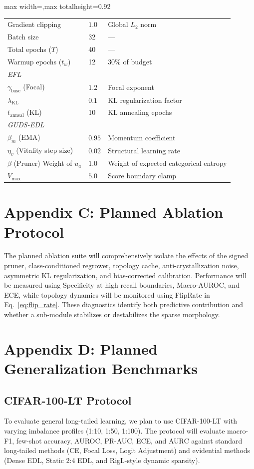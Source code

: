 \documentclass[letterpaper]{article} %
\begin{document}
\begin{table}[H]
\begin{adjustbox}{max width=\columnwidth,max totalheight=0.92\textheight}
\begin{tabular}{@{}p{}p{}p{}@{}}
Gradient clipping & $1.0$ & Global $L_2$ norm \\
Batch size & 32 & --- \\
Total epochs ($T$) & 40 & --- \\
Warmup epochs ($t_w$) & 12 & 30\% of budget \\
\midrule
\multicolumn{3}{l}{\emph{EFL}} \\
$\gamma_{\text{base}}$ (Focal) & $1.2$ & Focal exponent \\
$\lambda_{\text{KL}}$ & $0.1$ & KL regularization factor \\
$t_{\text{anneal}}$ (KL) & 10 & KL annealing epochs \\
\midrule
\multicolumn{3}{l}{\emph{GUDS-EDL}} \\
$\beta_m$ (EMA) & $0.95$ & Momentum coefficient \\
$\eta_v$ (Vitality step size) & $0.02$ & Structural learning rate \\
$\beta$ (Pruner) Weight of $u_a$ & $1.0$ & Weight of expected categorical entropy \\
$V_{\max}$ & $5.0$ & Score boundary clamp \\
\bottomrule
\end{tabular}
\end{adjustbox}
\end{table}

\FloatBarrier

\section{Appendix C: Planned Ablation Protocol}
The planned ablation suite will comprehensively isolate the effects of the signed pruner, class-conditioned regrower, topology cache, anti-crystallization noise, asymmetric KL regularization, and bias-corrected calibration. Performance will be measured using Specificity at high recall boundaries, Macro-AUROC, and ECE, while topology dynamics will be monitored using FlipRate in Eq.~\ref{eq:flip_rate}. These diagnostics identify both predictive contribution and whether a sub-module stabilizes or destabilizes the sparse morphology.

\section{Appendix D: Planned Generalization Benchmarks}

\subsection{CIFAR-100-LT Protocol}
To evaluate general long-tailed learning, we plan to use CIFAR-100-LT with varying imbalance profiles (1:10, 1:50, 1:100). The protocol will evaluate macro-F1, few-shot accuracy, AUROC, PR-AUC, ECE, and AURC against standard long-tailed methods (CE, Focal Loss, Logit Adjustment) and evidential methods (Dense EDL, Static 2:4 EDL, and RigL-style dynamic sparsity).
\end{document}
